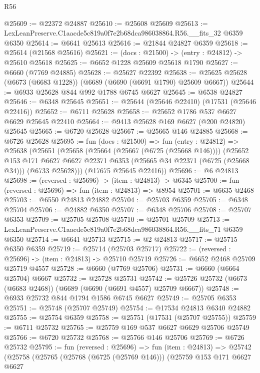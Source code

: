 \begin{lexlean}{R56}
\begin{coremodule}
@25609 := @22372 @24887
@25610 := @25608 @25609
@25613 := LexLeanPreserve.C1aacde5c819a0f7e2b68dca986038864.R56.__fits_32 @6359 @6350
@25614 := @6641 @25613
@25616 := @21844 @24827 @6359
@25618 := @25614 (@21568 @25616)
@25621 := (docs : @21500) -> (entry : @24812) -> @25610 @25618
@25625 := @6652 @1228 @25609 @25618 @1790
@25627 := @6660 (@7769 @24885)
@25628 := @25627 @22392
@25638 := @25625 @25628 (@6673 (@6683 @1228)) (@6689 (@6690 (@6691 @1790) @25609 @6667))
@25644 := @6933 @25628 @844 @992 @1788 @6745 @6627
@25645 := @6538 @24827
@25646 := @6348 @25645
@25651 := @25644 (@25646 @22410) (@17531 (@25646 @22416))
@25652 := @6711 @25628
@25658 := @25652 @1786 @537 @6627 @6629 @25645 @22410
@25664 := @9413 @25628 @169 @6627 (@200 @24820) @25645
@25665 := @6720 @25628
@25667 := @25665 @146 @24885
@25668 := @6726 @25628
@25695 := fun (docs : @21500) =>
  fun (entry : @24812) =>
  @25638
    (@25651
      (@25658
        (@25664 (@25667 (@6725 (@25668 @146))))
        (@25652
          @153
          @171
          @6627
          @6627
          @22371
          @6353
          (@25665 @34 @22371 (@6725 (@25668 @34)))
          (@6733 @25628)))
      (@17675 @25645 @22416))
@25696 := @6 @24813
@25698 := (reversed : @25696) -> (item : @24813) -> @6345
@25700 := fun (reversed : @25696) => fun (item : @24813) => @8954
@25701 := @6635 @2468
@25703 := @6550 @24813 @24882
@25704 := @25703 @6359
@25705 := @6348 @25704
@25706 := @24882 @6350
@25707 := @6348 @25706
@25708 := @25707 @6353
@25709 := @25705 @25708
@25710 := @25701 @25709
@25713 := LexLeanPreserve.C1aacde5c819a0f7e2b68dca986038864.R56.__fits_71 @6359 @6350
@25714 := @6641 @25713
@25715 := @2 @24813
@25717 := @25715 @6350 @6359
@25719 := @25714 (@25703 @25717)
@25722 := (reversed : @25696) -> (item : @24813) -> @25710 @25719
@25726 := @6652 @2468 @25709 @25719 @4557
@25728 := @6660 (@7769 @25706)
@25731 := @6660 (@6664 @25704) @6667
@25732 := @25728 @25731
@25742 := @25726 @25732 (@6673 (@6683 @2468)) (@6689 (@6690 (@6691 @4557) @25709 @6667))
@25748 := @6933 @25732 @844 @1794 @1586 @6745 @6627
@25749 := @25705 @6353
@25751 := @25748 (@25707 @25749)
@25754 := @17534 @24813 @6340 @24882
@25755 := @25754 @6359
@25758 := @25751 (@17531 (@25707 @25755))
@25759 := @6711 @25732
@25765 := @25759 @169 @537 @6627 @6629 @25706 @25749
@25766 := @6720 @25732
@25768 := @25766 @146 @25706
@25769 := @6726 @25732
@25795 := fun (reversed : @25696) =>
  fun (item : @24813) =>
  @25742
    (@25758
      (@25765
        (@25768 (@6725 (@25769 @146)))
        (@25759
          @153
          @171
          @6627
          @6627

\end{coremodule}
\end{lexlean}
